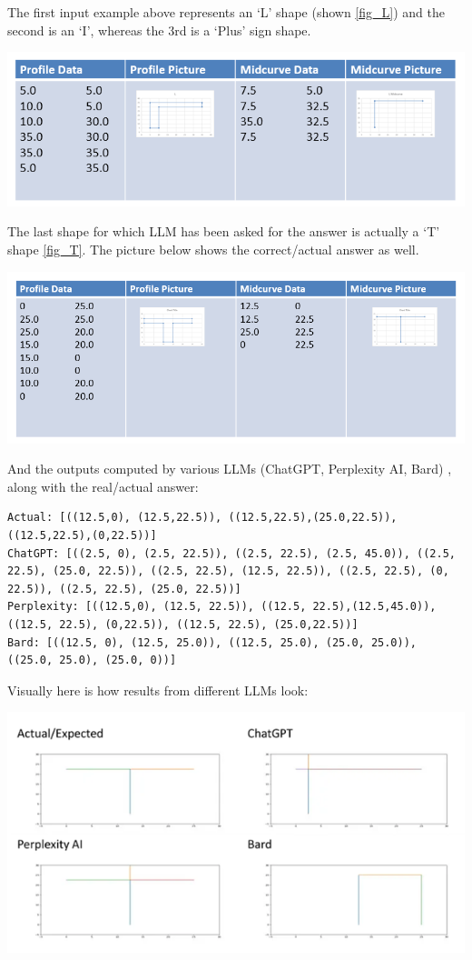 \documentclass[10pt, conference]{IEEEtran}
\begin{document}
The first input example above represents an ‘L’ shape (shown \ref{fig_L}) and the second is an ‘I’, whereas the 3rd is a ‘Plus’ sign shape.

    \begin{center}
	\includegraphics[width=0.8\linewidth]{images/L}
	\label{fig_L}
    \end{center}
    
    
The last shape for which LLM has been asked for the answer is actually a ‘T’ shape \ref{fig_T}. The picture below shows the correct/actual answer as well.

    \begin{center}
	\includegraphics[width=0.8\linewidth]{images/T}
	\label{fig_T}
    \end{center}
    
And the outputs computed by various LLMs (ChatGPT, Perplexity AI, Bard) , along with the real/actual answer:

\begin{lstlisting}[basicstyle=\tiny, breaklines=true, breakatwhitespace=true, label=lst:python]
Actual: [((12.5,0), (12.5,22.5)), ((12.5,22.5),(25.0,22.5)), ((12.5,22.5),(0,22.5))]
ChatGPT: [((2.5, 0), (2.5, 22.5)), ((2.5, 22.5), (2.5, 45.0)), ((2.5, 22.5), (25.0, 22.5)), ((2.5, 22.5), (12.5, 22.5)), ((2.5, 22.5), (0, 22.5)), ((2.5, 22.5), (25.0, 22.5))]
Perplexity: [((12.5,0), (12.5, 22.5)), ((12.5, 22.5),(12.5,45.0)), ((12.5, 22.5), (0,22.5)), ((12.5, 22.5), (25.0,22.5))]
Bard: [((12.5, 0), (12.5, 25.0)), ((12.5, 25.0), (25.0, 25.0)), ((25.0, 25.0), (25.0, 0))]
\end{lstlisting}

Visually here is how results from different LLMs look:

    \begin{center}
	\includegraphics[width=0.8\linewidth]{images/actual_predicted}
	\label{fig_results}
    \end{center}
    
\end{document}
